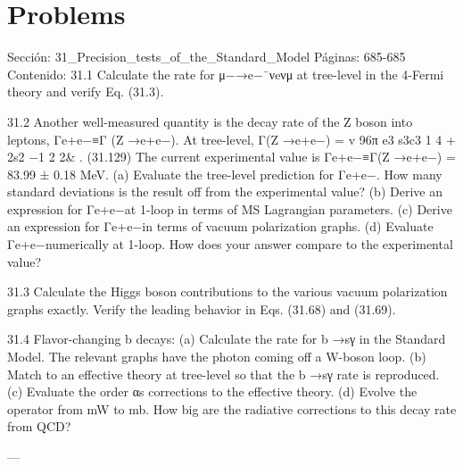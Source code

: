 \section*{Problems}
Sección: 31_Precision_tests_of_the_Standard_Model
Páginas: 685-685
Contenido:
31.1 Calculate the rate for μ−→e−¯νeνμ at tree-level in the 4-Fermi theory and verify
Eq. (31.3).

31.2 Another well-measured quantity is the decay rate of the Z boson into leptons,
Γe+e−≡Γ (Z →e+e−). At tree-level,
Γ(Z →e+e−) =
v
96π
e3
s3c3
%
1
4 +
2s2 −1
2
2&
.
(31.129)
The current experimental value is Γe+e−≡Γ(Z →e+e−) = 83.99 ± 0.18 MeV.
(a) Evaluate the tree-level prediction for Γe+e−. How many standard deviations is
the result off from the experimental value?
(b) Derive an expression for Γe+e−at 1-loop in terms of MS Lagrangian parameters.
(c) Derive an expression for Γe+e−in terms of vacuum polarization graphs.
(d) Evaluate Γe+e−numerically at 1-loop. How does your answer compare to the
experimental value?

31.3 Calculate the Higgs boson contributions to the various vacuum polarization graphs
exactly. Verify the leading behavior in Eqs. (31.68) and (31.69).

31.4 Flavor-changing b decays:
(a) Calculate the rate for b →sγ in the Standard Model. The relevant graphs have
the photon coming off a W-boson loop.
(b) Match to an effective theory at tree-level so that the b →sγ rate is reproduced.
(c) Evaluate the order αs corrections to the effective theory.
(d) Evolve the operator from mW to mb. How big are the radiative corrections to
this decay rate from QCD?


---

